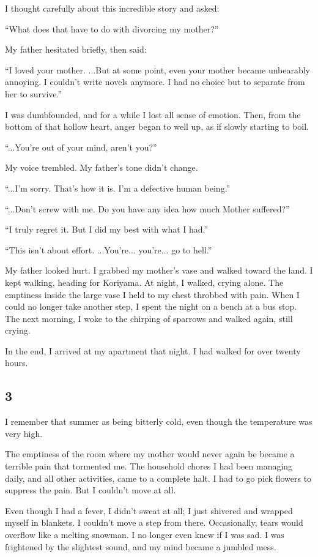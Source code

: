 \documentclass[
    a4paper,
    12pt,
    twoside,
    openany,
    UTF8,
    fontset=windows
]{ctexbook}
\begin{document}
I thought carefully about this incredible story and asked:

``What does that have to do with divorcing my mother?''

My father hesitated briefly, then said:

``I loved your mother. ...But at some point, even your mother became unbearably annoying. I couldn't write novels anymore. I had no choice but to separate from her to survive.''

I was dumbfounded, and for a while I lost all sense of emotion. Then, from the bottom of that hollow heart, anger began to well up, as if slowly starting to boil.

``...You're out of your mind, aren't you?''

My voice trembled. My father's tone didn't change.

``...I'm sorry. That's how it is. I'm a defective human being.''

``...Don't screw with me. Do you have any idea how much Mother suffered?''

``I truly regret it. But I did my best with what I had.''

``This isn't about effort. ...You're... you're... go to hell.''

My father looked hurt. I grabbed my mother's vase and walked toward the land. I kept walking, heading for Koriyama. At night, I walked, crying alone. The emptiness inside the large vase I held to my chest throbbed with pain. When I could no longer take another step, I spent the night on a bench at a bus stop. The next morning, I woke to the chirping of sparrows and walked again, still crying.

In the end, I arrived at my apartment that night. I had walked for over twenty hours.


\subsection*{3}

I remember that summer as being bitterly cold, even though the temperature was very high.

The emptiness of the room where my mother would never again be became a terrible pain that tormented me. The household chores I had been managing daily, and all other activities, came to a complete halt. I had to go pick flowers to suppress the pain. But I couldn't move at all.

Even though I had a fever, I didn't sweat at all; I just shivered and wrapped myself in blankets. I couldn't move a step from there. Occasionally, tears would overflow like a melting snowman. I no longer even knew if I was sad. I was frightened by the slightest sound, and my mind became a jumbled mess.
\end{document}
